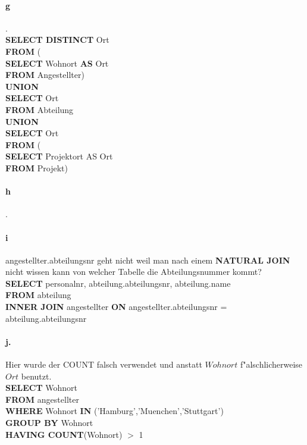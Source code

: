 \documentclass{article}
\begin{document}
		\paragraph*{g}.\\
			\textbf{SELECT DISTINCT} Ort\\ \textbf{FROM} (\\\textbf{SELECT} Wohnort \textbf{AS} Ort\\ \textbf{FROM} Angestellter) \\
			\textbf{UNION} \\
			\textbf{SELECT} Ort\\ \textbf{FROM} Abteilung\\
			\textbf{UNION}\\
			\textbf{SELECT} Ort\\ \textbf{FROM} (\\ \textbf{SELECT} Projektort AS Ort\\ \textbf{FROM} Projekt)\\
				
		\paragraph*{h}.\\
			
						
			
		
		\paragraph*{i}angestellter.abteilungsnr geht nicht weil man nach einem \textbf{NATURAL JOIN} nicht wissen kann von welcher Tabelle die Abteilungsnummer kommt?\\
			\textbf{SELECT} personalnr, abteilung.abteilungsnr, abteilung.name\\
			\textbf{FROM} abteilung\\ 
			\textbf{INNER JOIN} angestellter \textbf{ON} angestellter.abteilungsnr = abteilung.abteilungsnr
			
		\paragraph*{j.}Hier wurde der COUNT falsch verwendet und anstatt $Wohnort$ f"alschlicherweise $Ort$ benutzt.\\
			\textbf{SELECT} Wohnort\\
			\textbf{FROM} angestellter\\
			\textbf{WHERE} Wohnort \textbf{IN} ('Hamburg','Muenchen','Stuttgart')\\
			\textbf{GROUP BY} Wohnort\\
			\textbf{HAVING COUNT}(Wohnort) $>$ 1\\
			
\end{document}
